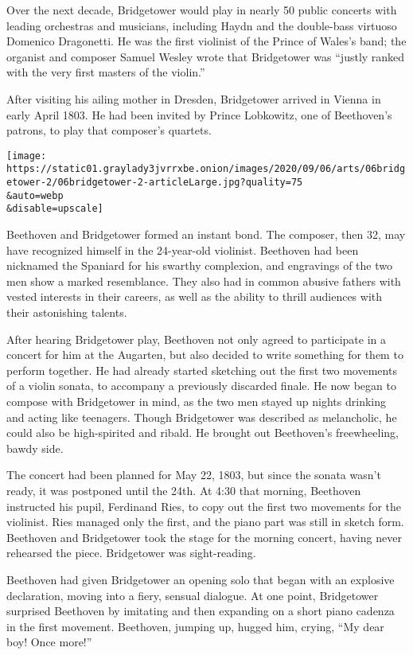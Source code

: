 Over the next decade, Bridgetower would play in nearly 50 public
concerts with leading orchestras and musicians, including Haydn and the
double-bass virtuoso Domenico Dragonetti. He was the first violinist of
the Prince of Wales's band; the organist and composer Samuel Wesley
wrote that Bridgetower was ``justly ranked with the very first masters
of the violin.''

After visiting his ailing mother in Dresden, Bridgetower arrived in
Vienna in early April 1803. He had been invited by Prince Lobkowitz, one
of Beethoven's patrons, to play that composer's quartets.

\texttt{[image: https://static01.graylady3jvrrxbe.onion/images/2020/09/06/arts/06bridgetower-2/06bridgetower-2-articleLarge.jpg?quality=75\\\&auto=webp\\\&disable=upscale]}

Beethoven and Bridgetower formed an instant bond. The composer, then 32,
may have recognized himself in the 24-year-old violinist. Beethoven had
been nicknamed the Spaniard for his swarthy complexion, and engravings
of the two men show a marked resemblance. They also had in common
abusive fathers with vested interests in their careers, as well as the
ability to thrill audiences with their astonishing talents.

After hearing Bridgetower play, Beethoven not only agreed to participate
in a concert for him at the Augarten, but also decided to write
something for them to perform together. He had already started sketching
out the first two movements of a violin sonata, to accompany a
previously discarded finale. He now began to compose with Bridgetower in
mind, as the two men stayed up nights drinking and acting like
teenagers. Though Bridgetower was described as melancholic, he could
also be high-spirited and ribald. He brought out Beethoven's
freewheeling, bawdy side.

The concert had been planned for May 22, 1803, but since the sonata
wasn't ready, it was postponed until the 24th. At 4:30 that morning,
Beethoven instructed his pupil, Ferdinand Ries, to copy out the first
two movements for the violinist. Ries managed only the first, and the
piano part was still in sketch form. Beethoven and Bridgetower took the
stage for the morning concert, having never rehearsed the piece.
Bridgetower was sight-reading.

Beethoven had given Bridgetower an opening solo that began with an
explosive declaration, moving into a fiery, sensual dialogue. At one
point, Bridgetower surprised Beethoven by imitating and then expanding
on a short piano cadenza in the first movement. Beethoven, jumping up,
hugged him, crying, ``My dear boy! Once more!''

